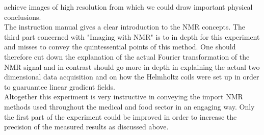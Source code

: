achieve images of high resolution from which we could draw important physical conclusions.\\
The instruction manual \cite{manual} gives a clear introduction to the NMR concepts. The third part concerned with "Imaging with NMR" is to in depth for this experiment and misses to convey the quintessential points of this method. One should therefore cut down the explanation of the actual Fourier transformation of the NMR signal and in contrast should go more in depth in explaining the actual two dimensional data acquisition and on how the Helmholtz coils were set up in order to guaruantee linear gradient fields.
\\
Altogether this experiment is very instructive in conveying the import NMR methods used throughout the medical and food sector in an engaging way. Only the first part of the experiment could be improved in order to increase the precision of the measured results as discussed above.